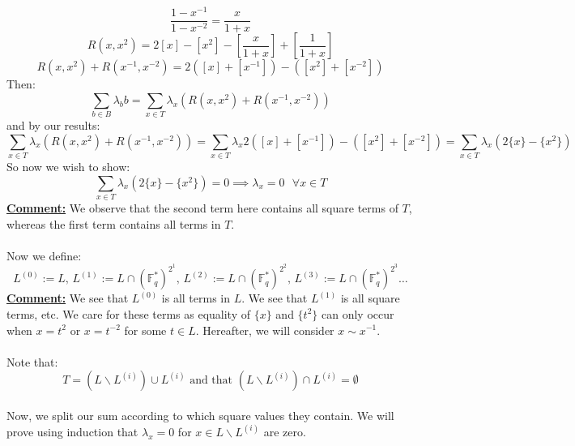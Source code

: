 \documentclass[11pt]{article}
\theoremstyle{plain}
\theoremstyle{definition}
\begin{document}
\begin{equation*}
\frac{1-x^{-1}}{1-x^{-2}} = \frac{x}{1+x}
\end{equation*}
\begin{equation*}
R(x,x^2) = 2[x] - [x^2] - [\frac{x}{1+x}] + [\frac{1}{1+x}] 
\end{equation*} 
\begin{equation*}
R(x,x^2) + R(x^{-1}, x^{-2})= 2([x] + [x^{-1}]) - ([x^2] + [x^{-2}]) 
\end{equation*} 
Then:
\begin{equation*}
\sum_{b \in B} \lambda_b b = \sum_{x \in T} \lambda_x (R(x,x^2) + R(x^{-1}, x^{-2}))
\end{equation*}
and by our results:
\begin{equation*}
\sum_{x \in T} \lambda_x (R(x,x^2) + R(x^{-1}, x^{-2})) = \sum_{x \in T} \lambda_x 2([x] + [x^{-1}]) - ([x^2] + [x^{-2}]) = \sum_{x \in T} \lambda_x (2\{x\} - \{x^2\}) 
\end{equation*}
So now we wish to show:
\begin{equation*}
\sum_{x \in T} \lambda_x (2\{x\} - \{x^2\}) = 0 \implies  \lambda_x = 0\text{ } \forall x \in T 
\end{equation*}
\textbf{\underline{Comment:}} We observe that the second term here contains all square terms of $T$, whereas the first term contains all terms in $T$.\\
\\
Now we define:
\begin{equation*}
L^{(0)} :=L \text{, }L^{(1)} :=L \cap (\mathbb{F}_q ^*)^{2^1}\text{, }L^{(2)} :=L \cap (\mathbb{F}_q ^*)^{2^2}\text{, }L^{(3)} :=L \cap (\mathbb{F}_q ^*)^{2^3} \ldots
\end{equation*}
\textbf{\underline{Comment:}} We see that $L^{(0)}$  is all terms in $L$. We see that $L^{(1)}$ is all square terms, etc. We care for these terms as equality of $\{x\}$ and $\{t^2\} $ can only occur when $x=t^2$ or $x=t^{-2}$ for some $t\in L$. Hereafter, we will consider $x \sim x^{-1}$.\\
\\
Note that:
\begin{equation*}
T = (L \backslash L^{(i)}) \cup L^{(i)} \text{ and that } (L\backslash L^{(i)}) \cap L^{(i)} = \emptyset 
\end{equation*}
\\
Now, we split our sum according to which square values they contain. We will prove using induction that $\lambda_x = 0$ for $x \in L \backslash L^(i)$ are zero.\\
\end{document}

